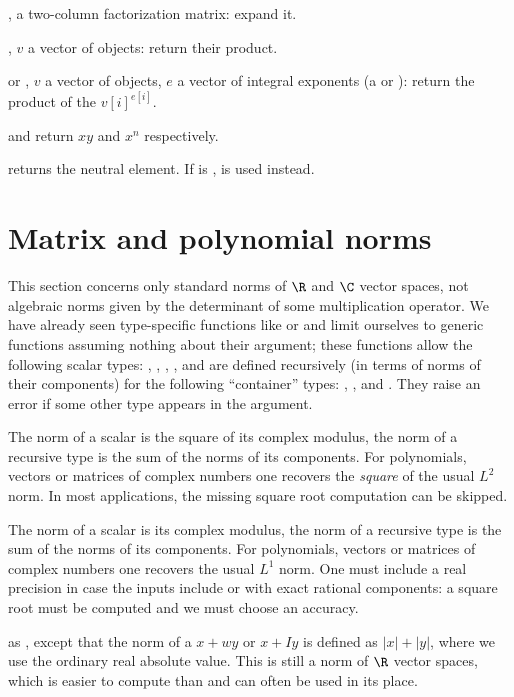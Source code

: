 \item \kbd{[fa, NULL]},  a two-column factorization matrix: expand it.

\item  \kbd{[v, NULL]}, $v$ a vector of objects: return their product.

\item or \kbd{[v, e]},  $v$ a vector of objects, $e$ a vector of integral
exponents (a  or ): return the product of the $v[i]^{e[i]}$.

\noindent {} and 
return $xy$ and $x^n$ respectively.

\noindent {} returns the neutral element. If  is ,
 is used instead.

\section{Matrix and polynomial norms} This section concerns only standard norms
of $\R$ and $\C$ vector spaces, not algebraic norms given by the determinant of
some multiplication operator. We have already seen type-specific functions like
 or  and limit ourselves to generic functions
assuming nothing about their  argument; these functions allow
the following scalar types: , , , ,
 and are defined recursively (in terms of norms of their components)
for the following ``container'' types: , ,  and
. They raise an error if some other type appears in the argument.

 The norm of a scalar is the square of its complex
modulus, the norm of a recursive type is the sum of the norms of its components.
For polynomials, vectors or matrices of complex numbers one recovers the
\emph{square} of the usual $L^2$ norm. In most applications, the missing square
root computation can be skipped.

 The norm of a scalar is its complex
modulus, the norm of a recursive type is the sum of the norms of its components.
For polynomials, vectors or matrices of complex numbers one recovers
the usual $L^1$ norm. One must include a real precision  in case
the inputs include  or  with exact rational components:
a square root must be computed and we must choose an accuracy.

 as , except that the norm
of a  $x + wy$ or  $x + Iy$ is defined as
$|x| + |y|$, where we use the ordinary real absolute value. This is still a norm
of $\R$ vector spaces, which is easier to compute than
 and can often be used in its place.

